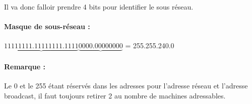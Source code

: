 \documentclass{article}
\begin{document}
Il va donc falloir prendre 4 bits pour identifier le sous réseau.

\paragraph{Masque de sous-réseau :} $\underbrace{1111 1111.1111 1111.1111} \underbrace{0000.0000 0000}$ = 255.255.240.0

\paragraph{Remarque :}Le 0 et le 255 étant réservés dans les adresses pour l'adresse réseau et l'adresse broadcast, il faut toujours retirer 2 au nombre de machines adressables.
\end{document}
